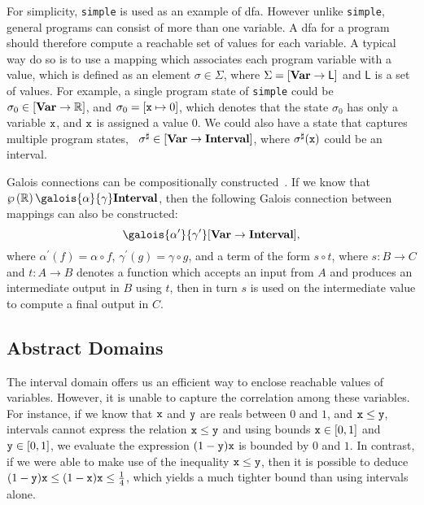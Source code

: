 For simplicity, \verb|simple| is used as an example of \gls{dfa}\@.  However
unlike \verb|simple|, general programs can consist of more than one variable.
A \gls{dfa} for a program should therefore compute a reachable set of values
for each variable.  A typical way do so is to use a mapping which associates
each program variable with a value, which is defined as an element $\sigma \in
\Sigma$, where $\Sigma = \left[\mathbf{Var} \to \mathsf{L}\right]$ and $\mathsf{L}$
is a set of values.  For example, a single program state of \verb|simple|
could be $\sigma_0 \in \left[\mathbf{Var} \to \mathbb{R}\right]$, and $\sigma_0 =
[\texttt{x} \mapsto 0]$, which denotes that the state $\sigma_0$ has only a variable
$\texttt{x}$, and $\texttt{x}$ is assigned a value $0$.  We could also have a state that
captures multiple program states, \eg~$\sigma^\sharp \in \left[\mathbf{Var} \to
\mathbf{Interval}\right]$, where $\sigma^\sharp(\texttt{x})$ could be an interval.

Galois connections can be compositionally constructed~\cite{nielson99}.  If
we know that $\powersetof\realset \galois{\alpha}{\gamma} \intervalset$, then
the following Galois connection between mappings can also be constructed:
\begin{equation}
    [\varset \to \powersetof\realset]
        \galois{\alpha^\prime}{\gamma^\prime}
    [\varset \to \intervalset],
\end{equation}
where $\alpha^\prime(f) = \alpha \circ f$, $\gamma^\prime(g) = \gamma \circ g$,
and a term of the form $s \circ t$, where $s: B \to C$ and $t: A \to B$ denotes
a function which accepts an input from $A$ and produces an intermediate output
in $B$ using $t$, then in turn $s$ is used on the intermediate value to compute
a final output in $C$.


\subsection{Abstract Domains}
\label{bg:sub:abstract_domains}

The interval domain offers us an efficient way to enclose reachable values
of variables.  However, it is unable to capture the correlation among these
variables.  For instance, if we know that $\texttt{x}$ and $\texttt{y}$ are reals between
$0$ and $1$, and $\texttt{x} \leq \texttt{y}$, intervals cannot express the relation
$\texttt{x} \leq \texttt{y}$ and using bounds $\texttt{x} \in [0, 1]$ and $\texttt{y} \in [0, 1]$,
we evaluate the expression $(1 - \texttt{y})\texttt{x}$ is bounded by $0$ and $1$.  In
contrast, if we were able to make use of the inequality $\texttt{x} \leq \texttt{y}$,
then it is possible to deduce $(1 - \texttt{y}) \texttt{x} \leq (1 - \texttt{x}) \texttt{x} \leq
\frac{1}{4}$, which yields a much tighter bound than using intervals alone.


